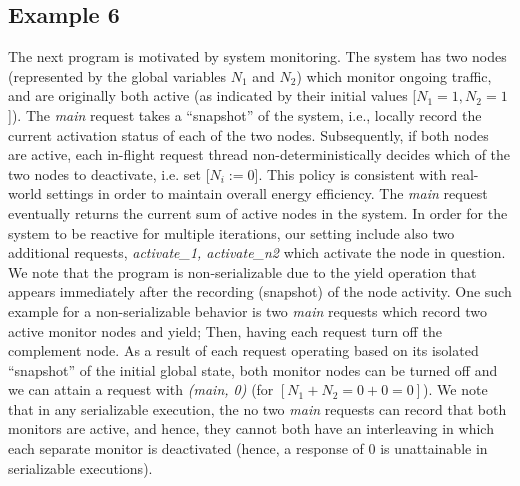 \subsection{Example 6}



The next program is motivated by system monitoring.
The system has two nodes (represented by the global variables $N_1$ and $N_2$) which monitor ongoing traffic, and are originally both active (as indicated by their initial values [$N_1=1,N_2=1$]).
%
The \textit{main} request takes a ``snapshot'' of the system, i.e., locally record the current activation status of each of the two nodes.
%
Subsequently, if both nodes are active, each in-flight request thread  non-deterministically decides which of the two nodes to deactivate, i.e. set [$N_i:=0$]. This policy is consistent with real-world settings in order to maintain overall energy efficiency.
%
The \textit{main} request eventually returns the current sum of active nodes in the system.
%
In order for the system to be reactive for multiple iterations, our setting include also two additional requests, \textit{activate\_1, activate\_n2} which activate the node in question.
%
We note that the program is non-serializable due to the yield operation that appears immediately after the recording (snapshot) of the node activity. One such example for a non-serializable behavior is two \textit{main} requests which record two active monitor nodes and yield; Then, having each request turn off the complement node. As a result of each request operating based on its isolated ``snapshot'' of the initial global state, both monitor nodes can be turned off and we can attain a request with \textit{(main, 0)} (for $[N_1+N_2=0+0=0]$).
%
We note that in any serializable execution, the no two \textit{main} requests can record that both monitors are active, and hence, they cannot both have an interleaving in which each separate monitor is deactivated (hence, a response of 0 is unattainable in serializable executions).





